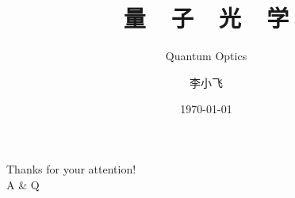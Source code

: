 \documentclass[12pt,UTF8,aspectratio=169]{beamer}
\begin{document}

\author{李小飞}
\title{\textbf{\Huge 量~~子~~光~~学}}
\subtitle{Quantum Optics}
\date{\today}

\begin{frame} [plain]
     {} %
    \Background[17] 
    \maketitle
    \addtocounter{framenumber}{-1} 
\end{frame}

%




\begin{frame}[plain]
    \Background[2] 
	\begin{center}
		{\huge \color{deepred} \textrm{Thanks for your attention!  \\ \vspace{1.0em}
         A \& Q}}
	\end{center}
    \addtocounter{framenumber}{-1} 
\end{frame}

\end{document}
